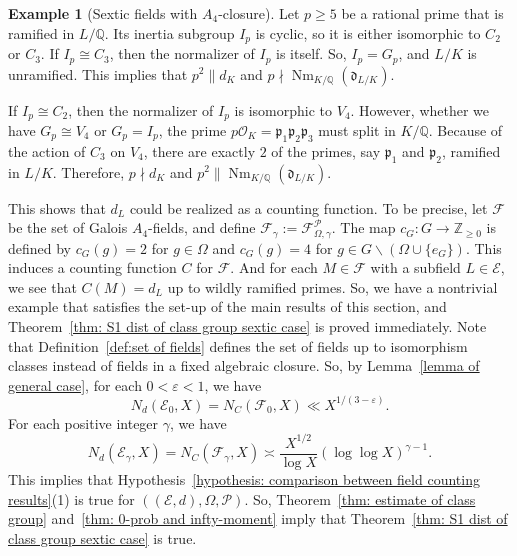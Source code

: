 \documentclass{amsart}
\numberwithin{equation}{section}
\theoremstyle{plain}
\theoremstyle{definition}
\newtheorem{example}[theorem]{Example}
\theoremstyle{remark}
\begin{document}
\begin{example}[Sextic fields with $A_4$-closure]
    Let $p\geq5$ be a rational prime that is ramified in $L/\mathbb{Q}$.
    Its inertia subgroup $I_p$ is cyclic, so it is either isomorphic to $C_2$ or $C_3$.
    If $I_p\cong C_3$, then the normalizer of $I_p$ is itself.
    So, $I_p=G_p$, and $L/K$ is unramified.
    This implies that $p^2\| d_K$ and $p\nmid\operatorname{Nm}_{K/\mathbb{Q}}(\mathfrak{d}_{L/K})$.
        
    If $I_p\cong C_2$, then the normalizer of $I_p$ is isomorphic to $V_4$.
    However, whether we have $G_p\cong V_4$ or $G_p=I_p$, the prime $p\mathscr{O}_K=\mathfrak{p}_1\mathfrak{p}_2\mathfrak{p}_3$ must split in $K/\mathbb{Q}$.
    Because of the action of $C_3$ on $V_4$, there are exactly $2$ of the primes, say $\mathfrak{p}_1$ and $\mathfrak{p}_2$, ramified in $L/K$.
    Therefore, $p\nmid d_K$ and $p^2\|\operatorname{Nm}_{K/\mathbb{Q}}(\mathfrak{d}_{L/K})$.

    This shows that $d_L$ could be realized as a counting function.
    To be precise, let $\mathcal{F}$ be the set of Galois $A_4$-fields, and define $\mathcal{F}_{\gamma}:=\mathcal{F}_{\Omega,\gamma}^{\mathcal{P}}$.
    The map $c_G:G\to\mathbb{Z}_{\geq0}$ is defined by $c_G(g)=2$ for $g\in\Omega$ and $c_G(g)=4$ for $g\in G\backslash(\Omega\cup\{e_G\})$.
    This induces a counting function $C$ for $\mathcal{F}$.
    And for each $M\in\mathcal{F}$ with a subfield $L\in\mathcal{E}$, we see that $C(M)=d_L$ up to wildly ramified primes.    
	So, we have a nontrivial example that satisfies the set-up of the main results of this section, and Theorem~\ref{thm: S1 dist of class group sextic case} is proved immediately.
	Note that Definition~\ref{def:set of fields} defines the set of fields up to isomorphism classes instead of fields in a fixed algebraic closure.
    So, by Lemma~\ref{lemma of general case}, for each $0<\varepsilon<1$, we have
        \begin{equation*}
            N_d(\mathcal{E}_0,X)=N_C(\mathcal{F}_0,X)\ll X^{1/(3-\varepsilon)}.
        \end{equation*}
    For each positive integer $\gamma$, we have
        \begin{equation*}
            N_d(\mathcal{E}_{\gamma},X)=N_C(\mathcal{F}_{\gamma},X)\asymp\frac{X^{1/2}}{\log X}(\log\log X)^{\gamma-1}.
        \end{equation*}
    This implies that Hypothesis~\ref{hypothesis: comparison between field counting results}(1) is true for $((\mathcal{E},d),\Omega,\mathcal{P})$.
    So, Theorem~\ref{thm: estimate of class group} and~\ref{thm: 0-prob and infty-moment} imply that Theorem~\ref{thm: S1 dist of class group sextic case} is true.
\end{example}
\end{document}
